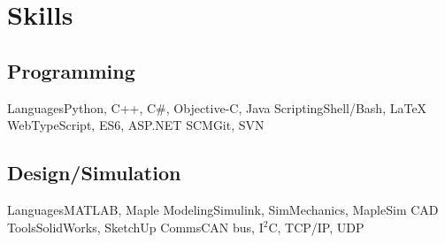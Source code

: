 \section{Skills}

\subsection
	{Programming}
\cvcomputer
	{Languages}{Python, C++, C\#, Objective-C, Java}
    {Scripting}{Shell/Bash, \LaTeX{}}
\cvcomputer
	{Web}{TypeScript, ES6, ASP.NET}
	{SCM}{Git, SVN}
    
\subsection
	{Design/Simulation}
\cvcomputer
	{Languages}{MATLAB, Maple}
	{Modeling}{Simulink, SimMechanics, MapleSim}
\cvcomputer
	{CAD Tools}{SolidWorks, SketchUp}
	{Comms}{CAN bus, I$^2$C, TCP/IP, UDP}
